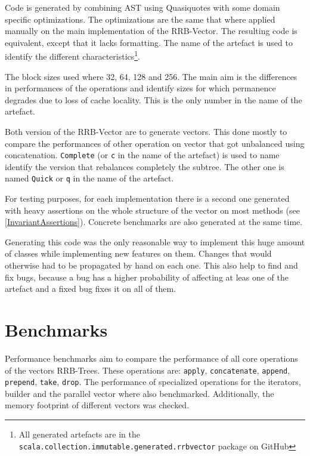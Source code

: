 Code is generated by combining AST using Quasiquotes with some domain specific optimizations. The optimizations are the same that where applied manually on the main implementation of the RRB-Vector. The resulting code is equivalent, except that it lacks formatting. The name of the artefact is used to identify the different characteristics\footnote{All generated artefacts are in the \texttt{scala.collection.immutable.generated.rrbvector} package on GitHub}.

The block sizes used where 32, 64, 128 and 256. 
The main aim is the differences in performances of the operations and identify sizes for which permanence degrades due to loss of cache locality. 
This is the only number in the name of the artefact.

Both version of the RRB-Vector are to generate vectors. 
This done mostly to compare the performances of other operation on vector that got unbalanced using concatenation. 
\texttt{Complete} (or \texttt{c} in the name of the artefact) is used to name identify the version that rebalances completely the subtree. 
The other one is named \texttt{Quick} or \texttt{q} in the name of the artefact.

For testing purposes, for each implementation there is a second one generated with heavy assertions on the whole structure of the vector on most methods (see \ref{InvariantAssertions}). 
Concrete benchmarks are also generated at the same time.

Generating this code was the only reasonable way to implement this huge amount of classes while implementing new features on them. 
Changes that would otherwise had to be propagated by hand on each one. 
This also help to find and fix bugs, because a bug has a higher probability of affecting at leas one of the artefact and a fixed bug fixes it on all of them.

\clearpage
\section{Benchmarks}
Performance benchmarks aim to compare the performance of all core operations of the vectors RRB-Trees. These operations are: \texttt{apply}, \texttt{concatenate}, \texttt{append}, \texttt{prepend}, \texttt{take}, \texttt{drop}. The performance of specialized operations for the iterators, builder and the parallel vector where also benchmarked. Additionally, the memory footprint of different vectors was checked.

